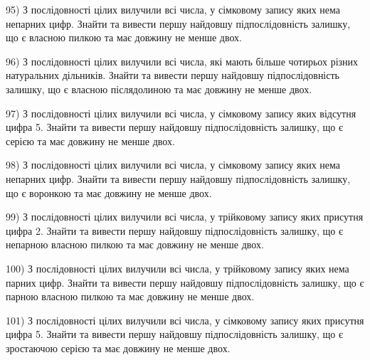 \documentclass[11pt, ukrainian]{article}
\begin{document}
\par
\vspace{0.9cm}
95) \space 
З послідовності цілих вилучили всі числа, у сімковому запису яких нема непарних цифр. Знайти та вивести першу найдовшу підпослідовність залишку, що є власною пилкою та має довжину не менше двох.

\par
\vspace{0.9cm}
96) \space 
З послідовності цілих вилучили всі числа, які мають більше чотирьох різних натуральних дільників. Знайти та вивести першу найдовшу підпослідовність залишку, що є власною післядолиною та має довжину не менше двох.

\par
\vspace{0.9cm}
97) \space 
З послідовності цілих вилучили всі числа, у сімковому запису яких відсутня цифра 5. Знайти та вивести першу найдовшу підпослідовність залишку, що є серією та має довжину не менше двох.

\par
\vspace{0.9cm}
98) \space 
З послідовності цілих вилучили всі числа, у сімковому запису яких нема непарних цифр. Знайти та вивести першу найдовшу підпослідовність залишку, що є воронкою та має довжину не менше двох.

\par
\vspace{0.9cm}
99) \space 
З послідовності цілих вилучили всі числа, у трійковому запису яких присутня цифра 2. Знайти та вивести першу найдовшу підпослідовність залишку, що є непарною власною пилкою та має довжину не менше двох.

\par
\vspace{0.9cm}
100) \space 
З послідовності цілих вилучили всі числа, у трійковому запису яких нема парних цифр. Знайти та вивести першу найдовшу підпослідовність залишку, що є парною власною пилкою та має довжину не менше двох.

\par
\vspace{0.9cm}
101) \space 
З послідовності цілих вилучили всі числа, у сімковому запису яких присутня цифра 5. Знайти та вивести першу найдовшу підпослідовність залишку, що є зростаючою серією та має довжину не менше двох.
\end{document}
